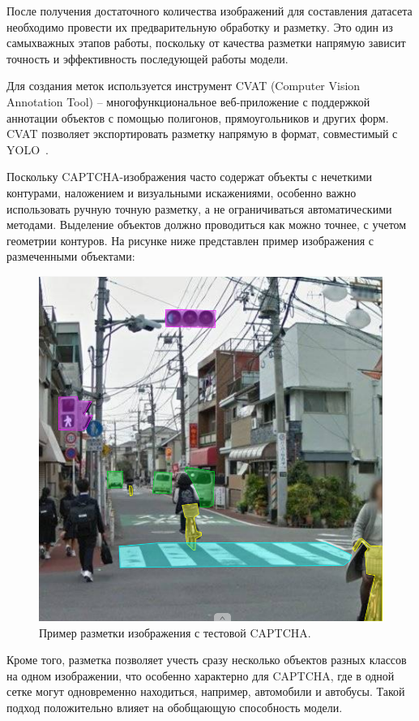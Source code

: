 После получения достаточного количества изображений для составления датасета 
необходимо провести их предварительную обработку и разметку. Это один из 
самыхважных этапов работы, поскольку от качества разметки напрямую зависит 
точность и эффективность последующей работы модели.

Для создания меток используется инструмент CVAT (Computer Vision Annotation Tool) 
-- многофункциональное веб-приложение с поддержкой аннотации объектов с помощью 
полигонов, прямоугольников и других форм. CVAT позволяет экспортировать разметку 
напрямую в формат, совместимый с YOLO~\cite{CVAT}.

Поскольку CAPTCHA-изображения часто содержат объекты с нечеткими контурами, 
наложением и визуальными искажениями, особенно важно использовать ручную точную 
разметку, а не ограничиваться автоматическими методами. Выделение объектов должно 
проводиться как можно точнее, с учетом геометрии контуров. На рисунке ниже 
представлен пример изображения с размеченными объектами:

\begin{figure}[H]
    \centering
    \includegraphics[width=0.9\linewidth]{imgs/imagecaptcha/captcha-poligons.png}
    \caption{Пример разметки изображения с тестовой CAPTCHA.}
    \label{fig:mask-captcha}
\end{figure}
\vspace{-0.5cm}

Кроме того, разметка позволяет учесть сразу несколько объектов разных классов на 
одном изображении, что особенно характерно для CAPTCHA, где в одной сетке могут 
одновременно находиться, например, автомобили и автобусы. Такой подход 
положительно влияет на обобщающую способность модели.

